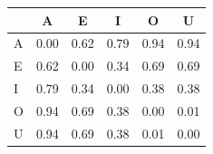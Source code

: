 \begin{tabular}{lccccc}
\toprule
\rowcolor{col01}
 & A & E & I & O & U \\
\midrule
A & 0.00 & 0.62 & 0.79 & 0.94 & 0.94 \\
E & 0.62 & 0.00 & 0.34 & 0.69 & 0.69 \\
I & 0.79 & 0.34 & 0.00 & 0.38 & 0.38 \\
O & 0.94 & 0.69 & 0.38 & 0.00 & 0.01 \\
U & 0.94 & 0.69 & 0.38 & 0.01 & 0.00 \\
\bottomrule
\end{tabular}

